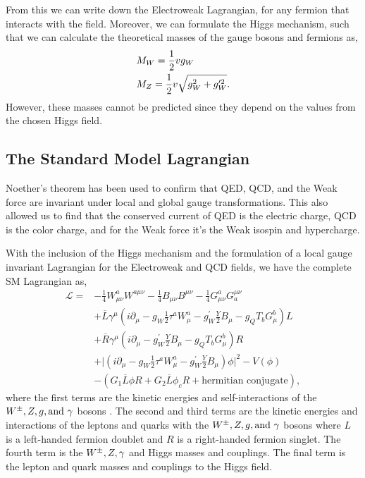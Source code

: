 From this we can write down the Electroweak Lagrangian, for any fermion that interacts with the field. Moreover, we can formulate the Higgs mechanism, such that we can calculate the theoretical masses of the gauge bosons and fermions as, 
\begin{equation}
\begin{split}
& M_{W}=\frac{1}{2}vg_W \\
& M_{Z}=\frac{1}{2}v\sqrt{g_W^2+g_W^{\prime 2}}.
\end{split}
\end{equation}
However, these masses cannot be predicted since they depend on the values from the chosen Higgs field. 

\subsection{The Standard Model Lagrangian}

Noether's theorem has been used to confirm that QED, QCD, and the Weak force are invariant under local and global gauge transformations. This also allowed us to find that the conserved current of QED is the electric charge, QCD is the color charge, and for the Weak force it's the Weak isospin and hypercharge. 

With the inclusion of the Higgs mechanism and the formulation of a local gauge invariant Lagrangian for the Electroweak and QCD fields, we have the complete SM Lagrangian as,
\begin{equation}\label{SMLagrangian}
\begin{split}
\mathcal{L}=&-\frac{1}{4}W^a_{\mu\nu}W^{a\mu\nu}-\frac{1}{4}B_{\mu\nu}B^{\mu\nu}-\frac{1}{4}G^a_{\mu\nu}G_a^{\mu\nu} \\
&+\overline{L}\gamma^\mu(i\partial_\mu-g_{W}\frac{1}{2}\tau^{a}W^{a}_{\mu}-g^{\prime}_{W}\frac{Y}{2}B_\mu-g_{Q}T_{b}G^{b}_{\mu})L \\
&+\overline{R}\gamma^\mu(i\partial_\mu-g^{\prime}_{W}\frac{Y}{2}B_\mu-g_{Q}T_{b}G^{b}_{\mu})R \\
&+\lvert(i\partial_\mu-g_{W}\frac{1}{2}\tau^{a}W^{a}_\mu-g^{\prime}_{W}\frac{Y}{2}B_\mu)\phi\lvert^2-V(\phi) \\
&-(G_1\overline{L}\phi R+G_2\overline{L}\phi_cR+\text{hermitian conjugate}),
\end{split}
\end{equation}
where the first terms are the kinetic energies and self-interactions of the $W^\pm,Z, g, \text{and } \gamma$ bosons \cite{gaillard_standard_1999, halzen_quarks_1984, griffiths_introduction_2008}. The second and third terms are the kinetic energies and interactions of the leptons and quarks with the $W^\pm,Z, g, \text{and } \gamma$ bosons where $L$ is a left-handed fermion doublet and $R$ is a right-handed fermion singlet. The fourth term is the $W^\pm,Z,\gamma$ and Higgs masses and couplings. The final term is the lepton and quark masses and couplings to the Higgs field.  


